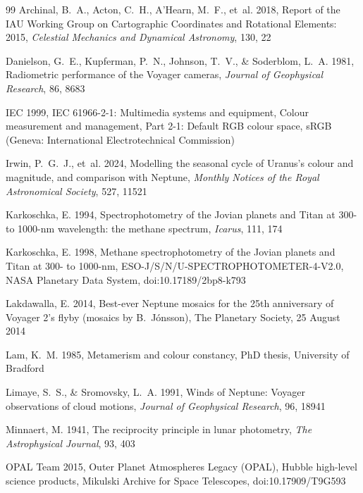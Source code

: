 \documentclass[11pt,a4paper]{article}
\begin{document}
{\small
\begin{thebibliography}{99}
Archinal, B.~A., Acton, C.~H., A'Hearn, M.~F., et~al. 2018, Report of the IAU Working Group on
Cartographic Coordinates and Rotational Elements: 2015, \textit{Celestial Mechanics and Dynamical
Astronomy}, 130, 22

Danielson, G.~E., Kupferman, P.~N., Johnson, T.~V., \& Soderblom, L.~A. 1981, Radiometric
performance of the Voyager cameras, \textit{Journal of Geophysical Research}, 86, 8683

IEC 1999, IEC 61966-2-1: Multimedia systems and equipment, Colour measurement and management,
Part 2-1: Default RGB colour space, sRGB (Geneva: International Electrotechnical Commission)

Irwin, P.~G.~J., et~al. 2024, Modelling the seasonal cycle of Uranus's colour and magnitude, and
comparison with Neptune, \textit{Monthly Notices of the Royal Astronomical Society}, 527, 11521

Karkoschka, E. 1994, Spectrophotometry of the Jovian planets and Titan at 300- to 1000-nm
wavelength: the methane spectrum, \textit{Icarus}, 111, 174

Karkoschka, E. 1998, Methane spectrophotometry of the Jovian planets and Titan at 300- to 1000-nm,
ESO-J/S/N/U-SPECTROPHOTOMETER-4-V2.0, NASA Planetary Data System, doi:10.17189/2bp8-k793

Lakdawalla, E. 2014, Best-ever Neptune mosaics for the 25th anniversary of Voyager 2's flyby
(mosaics by B.~Jónsson), The Planetary Society, 25 August 2014

Lam, K.~M. 1985, Metamerism and colour constancy, PhD thesis, University of Bradford

Limaye, S.~S., \& Sromovsky, L.~A. 1991, Winds of Neptune: Voyager observations of cloud motions,
\textit{Journal of Geophysical Research}, 96, 18941

Minnaert, M. 1941, The reciprocity principle in lunar photometry, \textit{The Astrophysical
Journal}, 93, 403

OPAL Team 2015, Outer Planet Atmospheres Legacy (OPAL), Hubble high-level science products,
Mikulski Archive for Space Telescopes, doi:10.17909/T9G593


\end{thebibliography}}
\end{document}

